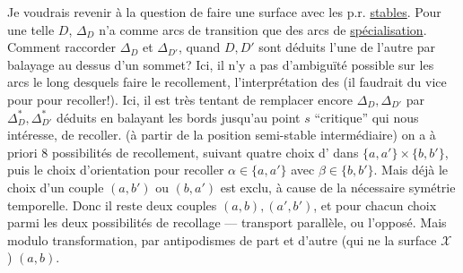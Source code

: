 Je voudrais revenir à la question de faire une surface avec les p.r. \uline{stables}. Pour une telle $D$, $\Delta_D$ n'a comme arcs de transition que des arcs de \uline{spécialisation}. Comment raccorder $\Delta_D$ et $\Delta_{D'}$, quand $D,D'$ sont déduits l'une de l'autre par balayage au dessus d'un sommet?
Ici, il n'y a pas d'ambiguïté possible sur les arcs le long desquels faire le recollement,   l'interprétation des  (il faudrait du vice pour  pour recoller!). Ici, il est très tentant de remplacer encore $\Delta_D,\Delta_{D'}$ par $\Delta_D^*,\Delta_{D'}^*$ déduits en balayant les bords jusqu'au point $s$ ``critique'' qui nous intéresse,  de recoller.
(à partir de la position semi-stable intermédiaire) on a à priori $8$ possibilités de recollement, suivant  quatre choix d' dans $\{a,a'\}\times\{b,b'\}$, puis le choix d'orientation pour recoller $\alpha\in\{a,a'\}$ avec $\beta\in\{b,b'\}$. Mais déjà le choix d'un couple $(a,b')$ ou $(b,a')$ est exclu, à cause de la nécessaire symétrie temporelle. Donc il reste deux couples $(a,b),(a',b')$, et pour chacun choix parmi les deux possibilités de recollage --- transport parallèle, ou l'opposé. Mais modulo  transformation, par antipodismes de part et d'autre (qui ne  la surface $\mathcal X$  )  $(a,b)$.
